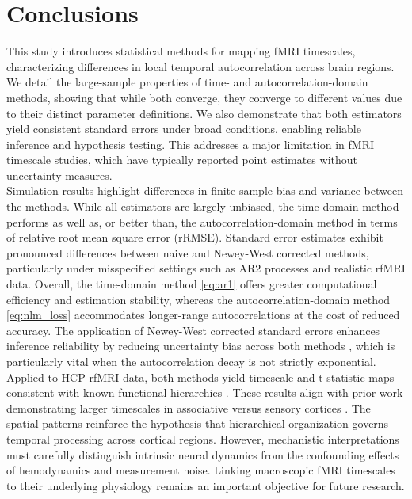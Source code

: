 \documentclass[docs/main.tex]{subfiles}
\begin{document}
\section{Conclusions}
This study introduces statistical methods for mapping fMRI timescales, characterizing differences in local temporal autocorrelation across brain regions. We detail the large-sample properties of time- and autocorrelation-domain methods, showing that while both converge, they converge to different values due to their distinct parameter definitions. We also demonstrate that both estimators yield consistent standard errors under broad conditions, enabling reliable inference and hypothesis testing. This addresses a major limitation in fMRI timescale studies, which have typically reported point estimates without uncertainty measures.\\

Simulation results highlight differences in finite sample bias and variance between the methods. While all estimators are largely unbiased, the time-domain method performs as well as, or better than, the autocorrelation-domain method in terms of relative root mean square error (rRMSE). Standard error estimates exhibit pronounced differences between naive and Newey-West corrected methods, particularly under misspecified settings such as AR2 processes and realistic rfMRI data. Overall, the time-domain method \eqref{eq:ar1} offers greater computational efficiency and estimation stability, whereas the autocorrelation-domain method \eqref{eq:nlm_loss} accommodates longer-range autocorrelations at the cost of reduced accuracy. The application of Newey-West corrected standard errors enhances inference reliability by reducing uncertainty bias across both methods \citep{newey_simple_1987}, which is particularly vital when the autocorrelation decay is not strictly exponential.\\

Applied to HCP rfMRI data, both methods yield timescale and t-statistic maps consistent with known functional hierarchies \citep{van_essen_wu-minn_2013}. These results align with prior work demonstrating larger timescales in associative versus sensory cortices \citep{raut_hierarchical_2020, shafiei_topographic_2020, lurie_cortical_2024, mitra_lag_2014, kaneoke_variance_2012, wengler_distinct_2020, shinn_functional_2023, manea_intrinsic_2022, ito_cortical_2020, muller_core_2020}. The spatial patterns reinforce the hypothesis that hierarchical organization governs temporal processing across cortical regions. However, mechanistic interpretations must carefully distinguish intrinsic neural dynamics from the confounding effects of hemodynamics and measurement noise. Linking macroscopic fMRI timescales to their underlying physiology remains an important objective for future research.\\
\end{document}

